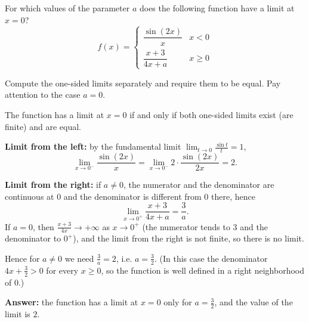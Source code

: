 
\begin{question}
For which values of the parameter $a$ does the following function have a limit at $x=0$?
\[ f(x)=\begin{cases} \dfrac{\sin(2x)}{x} & x<0 \\[2mm] \dfrac{x+3}{4x+a} & x\ge 0 \end{cases} \]
\end{question}

\begin{hint}
Compute the one-sided limits separately and require them to be equal. Pay attention to the case $a=0$.
\end{hint}

\begin{solution}
The function has a limit at $x=0$ if and only if both one-sided limits exist (are finite) and are equal.

\textbf{Limit from the left:} by the fundamental limit $\lim_{t\to 0}\frac{\sin t}{t}=1$,
\[ \lim_{x\to 0^-}\frac{\sin(2x)}{x}=\lim_{x\to 0^-}2\cdot\frac{\sin(2x)}{2x}=2. \]

\textbf{Limit from the right:} if $a\neq 0$, the numerator and the denominator are continuous at $0$ and the denominator is different from $0$ there, hence
\[ \lim_{x\to 0^+}\frac{x+3}{4x+a}=\frac{3}{a}. \]
If $a=0$, then $\frac{x+3}{4x}\to +\infty$ as $x\to 0^+$ (the numerator tends to $3$ and the denominator to $0^+$), and the limit from the right is not finite, so there is no limit.

Hence for $a\ne 0$ we need $\frac{3}{a}=2$, i.e. $a=\frac32$. (In this case the denominator $4x+\frac32>0$ for every $x\ge 0$, so the function is well defined in a right neighborhood of $0$.)

\textbf{Answer:} the function has a limit at $x=0$ only for $a=\frac{3}{2}$, and the value of the limit is $2$.
\end{solution}
